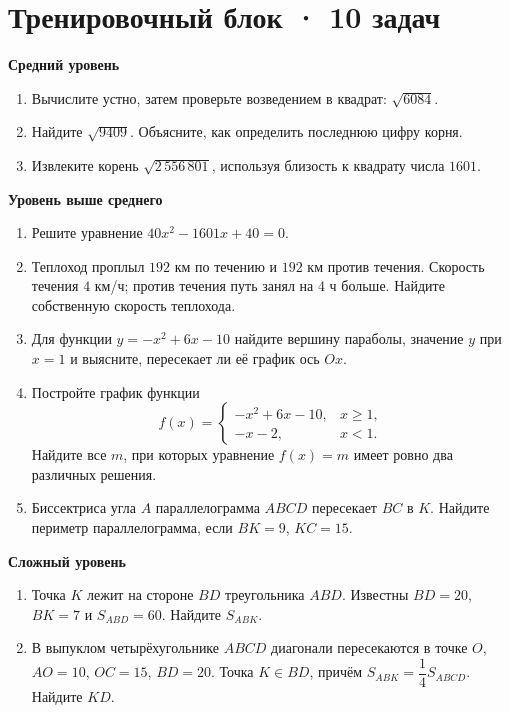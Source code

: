 \documentclass[a4paper,12pt]{article}
\begin{document}
\section*{Тренировочный блок · 10 задач}
\textcolor{darkaccent}{\textbf{Средний уровень}}
\begin{enumerate}
\item Вычислите устно, затем проверьте возведением в квадрат: $\sqrt{6084}$.
\item Найдите $\sqrt{9409}$. Объясните, как определить последнюю цифру корня.
\item Извлеките корень $\sqrt{2\,556\,801}$, используя близость к квадрату числа $1601$.
\end{enumerate}
\textcolor{darkaccent}{\textbf{Уровень выше среднего}}
\begin{enumerate}[resume]
\item Решите уравнение $40x^2-1601x+40=0$.
\item Теплоход проплыл $192$ км по течению и $192$ км против течения. Скорость течения $4$ км/ч; против течения путь занял на $4$ ч больше. Найдите собственную скорость теплохода.
\item Для функции $y=-x^2+6x-10$ найдите вершину параболы, значение $y$ при $x=1$ и выясните, пересекает ли её график ось $Ox$.
\item Постройте график функции
\[
f(x)=\begin{cases}-x^2+6x-10,&x\ge1,\\-x-2,&x<1.\end{cases}
\]
Найдите все $m$, при которых уравнение $f(x)=m$ имеет ровно два различных решения.
\item Биссектриса угла $A$ параллелограмма $ABCD$ пересекает $BC$ в $K$. Найдите периметр параллелограмма, если $BK=9$, $KC=15$.
\end{enumerate}
\textcolor{darkaccent}{\textbf{Сложный уровень}}
\begin{enumerate}[resume]
\item Точка $K$ лежит на стороне $BD$ треугольника $ABD$. Известны $BD=20$, $BK=7$ и $S_{ABD}=60$. Найдите $S_{ABK}$.
\item В выпуклом четырёхугольнике $ABCD$ диагонали пересекаются в точке $O$, $AO=10$, $OC=15$, $BD=20$. Точка $K\in BD$, причём $S_{ABK}=\dfrac14 S_{ABCD}$. Найдите $KD$.
\end{enumerate}
\clearpage
\end{document}
